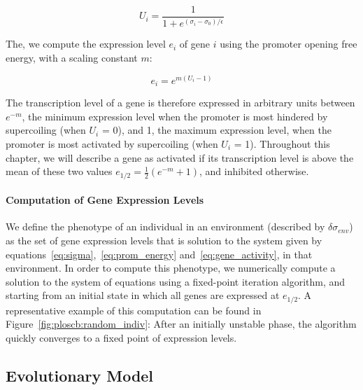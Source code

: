 \begin{equation}
U_i = \frac{1}{1 + e^{(\sigma_i - \sigma_0)/\epsilon}}
\label{eq:prom_energy}
\end{equation}

The, we compute the expression level $e_i$ of gene $i$ using the promoter opening free energy, with a scaling constant $m$:

\begin{equation}
e_i = e^{m (U_i - 1)}
\label{eq:gene_activity}
\end{equation}

The transcription level of a gene is therefore expressed in arbitrary units between $e^{-m}$, the minimum expression level when the promoter is most hindered by supercoiling (when $U_i$ = 0), and 1, the maximum expression level, when the promoter is most activated by supercoiling (when $U_i$ = 1).
Throughout this chapter, we will describe a gene as activated if its transcription level is above the mean of these two values $e_{1/2} = \frac{1}{2}(e^{-m} + 1)$, and inhibited otherwise.

\paragraph{Computation of Gene Expression Levels}

We define the phenotype of an individual in an environment (described by $\delta\sigma_{env}$) as the set of gene expression levels that is solution to the system given by equations~\ref{eq:sigma},~\ref{eq:prom_energy} and~\ref{eq:gene_activity}, in that environment.
In order to compute this phenotype, we numerically compute a solution to the system of equations using a fixed-point iteration algorithm, and starting from an initial state in which all genes are expressed at $e_{1/2}$.
A representative example of this computation can be found in Figure~\ref{fig:ploscb:random_indiv}: After an initially unstable phase, the algorithm quickly converges to a fixed point of expression levels.

\subsection{Evolutionary Model}
\label{sec:ploscb:evol_model}

